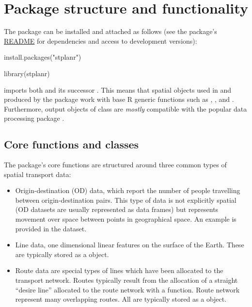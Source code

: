 \section{Package structure and
functionality}\label{package-structure-and-functionality}

The package can be installed and attached as follows (see the
package's \href{https://github.com/ropensci/stplanr}{README} for
dependencies and access to development versions):

\begin{Schunk}
\begin{Sinput}
install.packages("stplanr")
\end{Sinput}
\end{Schunk}

\begin{Schunk}
\begin{Sinput}
library(stplanr)
\end{Sinput}
\end{Schunk}

 imports both  and its successor .
This means that spatial objects used in and produced by the package
work with base R generic functions such as
, , and  \citep{bivand_applied_2013}.
Furthermore, output objects of class  are \textit{mostly} compatible with the popular data processing package .

\subsection{Core functions and
classes}\label{core-functions-and-classes}

The package's core functions are structured around three common types of
spatial transport data:

\begin{itemize}
\tightlist
\item
  Origin-destination (OD) data, which report the number of people
  travelling between origin-destination pairs. This type of data is not
  explicitly spatial (OD datasets are usually represented as data
  frames) but represents movement over space between points in
  geographical space. An example is provided in the 
  dataset.
\item
  Line data, one dimensional linear features on the surface of the
  Earth. These are typically stored as a
   object.
\item
  Route data are special types of lines which have been allocated to the
  transport network. Routes typically result from the allocation of a
  straight ``desire line'' allocated to the route network with a
   function. Route network represent many overlapping
  routes. All are typically stored as a 
  object.
\end{itemize}

